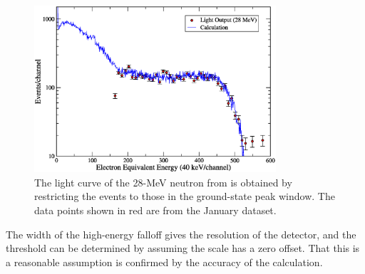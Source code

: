 \begin{figure}[!htbp]
\centering
\includegraphics[width=0.8\textwidth]{figures/Lite_28MeV.eps}
\caption{The light curve of the 28-MeV neutron from \MgReaction is obtained by restricting the events to those in the ground-state peak window.  The data points shown in red are from the January dataset.}
\label{fig:lowEnergyCut}
\end{figure}
The width of the high-energy falloff gives the resolution of the detector, and the threshold can be determined by assuming the scale has a zero offset.  That this is a reasonable assumption is confirmed by the accuracy of the calculation.  

